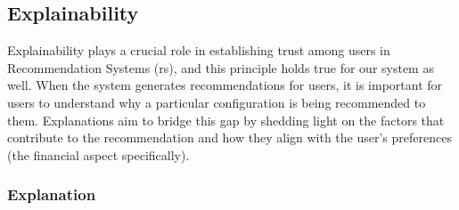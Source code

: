%


\subsection{Explainability}

Explainability plays a crucial role in establishing trust among users in Recommendation Systems (\gls{rs}), and this principle holds true for our system as well. 
When the system generates recommendations for users, it is important for users to understand why a particular configuration is being recommended to them. 
Explanations aim to bridge this gap by shedding light on the factors that contribute to the recommendation and how they align with the user's preferences (the financial aspect specifically). 


\subsubsection{Explanation}

